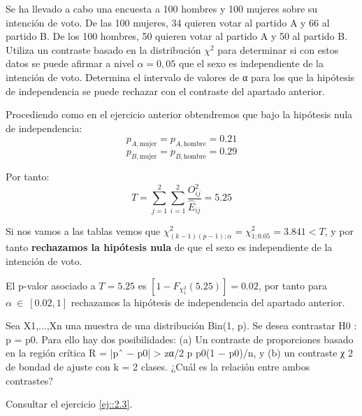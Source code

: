\begin{problem}[10] Se ha llevado a cabo una encuesta a 100 hombres y 100 mujeres sobre su intención de voto. De
las 100 mujeres, 34 quieren votar al partido A y 66 al partido B. De los 100 hombres, 50 quieren
votar al partido A y 50 al partido B.
\ppart
Utiliza un contraste basado en la distribución $χ^2$ para determinar si con estos datos se puede
afirmar a nivel $α = 0,05$ que el sexo es independiente de la intención de voto.
\ppart
Determina el intervalo de valores de α para los que la hipótesis de independencia se puede
rechazar con el contraste del apartado anterior.
\solution
{}

\spart
Procediendo como en el ejercicio anterior obtendremos que bajo la hipótesis nula de independencia:
\[p_{A,\text{mujer}} = p_{A, \text{hombre}} = 0.21\]
\[p_{B,\text{mujer}} = p_{B, \text{hombre}} = 0.29\]

Por tanto:
\[T=\sum_{j=1}^2 \sum_{i=1}^2 \frac{O_{ij}^2}{\hat{E}_{ij}} = 5.25\]

Si nos vamos a las tablas vemos que $χ^2_{(k-1)(p-1); α} = χ^2_{1; 0.05} = 3.841 < T$, y por tanto \textbf{rechazamos la hipótesis nula} de que el sexo es independiente de la intención de voto.

\spart
El p-valor asociado a $T=5.25$ es $\left[1 - F_{χ^2_{1}}(5.25)\right] = 0.02$, por tanto para $α~∈~[0.02,1]$ rechazamos la hipótesis de independencia del apartado anterior.

\end{problem}
\begin{problem}[11] Sea X1,...,Xn una muestra de una distribución Bin(1, p). Se desea contrastar H0 : p = p0.
Para ello hay dos posibilidades: (a) Un contraste de proporciones basado en la región crítica
R = {|pˆ − p0| > zα/2
p
p0(1 − p0)/n}, y (b) un contraste χ
2 de bondad de ajuste con k = 2 clases. ¿Cuál
es la relación entre ambos contrastes?
\solution

Consultar el ejercicio \ref{ej::2.3}.

\end{problem}
